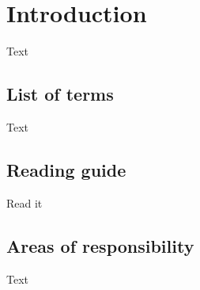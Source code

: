 \chapter{Introduction}
Text

\section{List of terms}
Text

\section{Reading guide}
Read it

\section{Areas of responsibility}
Text

